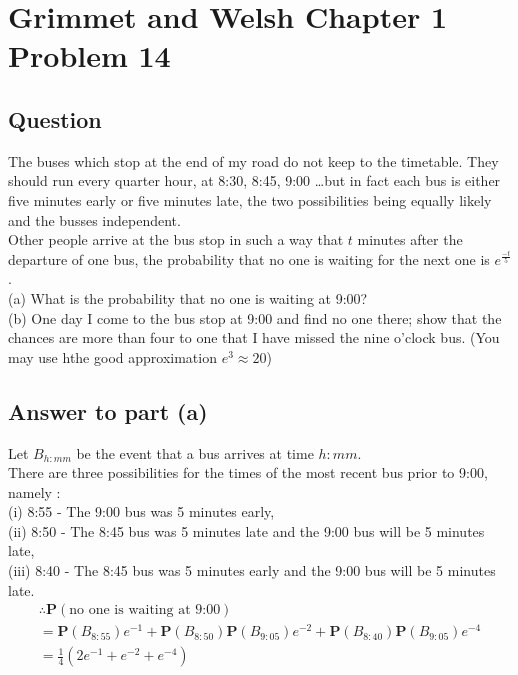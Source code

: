 \section{Grimmet and Welsh Chapter 1 Problem 14}
\subsection{Question}

The buses which stop at the end of my road do not keep to the timetable. They should run every quarter hour, at 8:30, 8:45, 9:00 \ldots but in fact each bus is either five minutes early
or five minutes late, the two possibilities being equally likely and the busses independent. \\
Other people arrive at the bus stop in such a way that $t$ minutes after the departure of one bus, the probability that no one is waiting for the next one is $e^\frac{-t}{5}$.\\
(a) What is the probability that no one is waiting at 9:00? \\
(b) One day I come to the bus stop at 9:00 and find no one there; show that the chances are more than four to one that I have missed the nine o'clock bus.
(You may use hthe good approximation $e^3 \approx 20$)

\subsection{Answer to part (a)}

Let $B_{h:mm}$ be the event that a bus arrives at time $h:mm$. \\
There are three possibilities for the times of the most recent bus prior to 9:00, namely : \\
(i) 8:55 - The 9:00 bus was 5 minutes early,\\
(ii) 8:50 - The 8:45 bus was 5 minutes late and the 9:00 bus will be 5 minutes late,\\
(iii) 8:40 - The 8:45 bus was 5 minutes early and the 9:00 bus will be 5 minutes late.\\
 
\begin{multline*} 
\therefore \mathbf{P} (\text{no one is waiting at 9:00}) \\
= \mathbf{P}(B_{8:55})e^{-1} + \mathbf{P}(B_{8:50})\mathbf{P}(B_{9:05})e^{-2} + \mathbf{P}(B_{8:40})\mathbf{P}(B_{9:05})e^{-4} \\
= \frac{1}{4}(2e^{-1} + e^{-2} + e^{-4})
\end{multline*}

